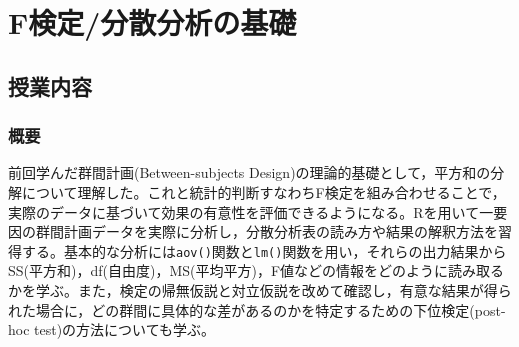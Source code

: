 \section{F検定/分散分析の基礎}
\label{b19_Ftest}

\subsection{授業内容}
\subsubsection{概要}
前回学んだ群間計画(Between-subjects Design)の理論的基礎として，平方和の分解について理解した。これと統計的判断すなわちF検定を組み合わせることで，実際のデータに基づいて効果の有意性を評価できるようになる。Rを用いて一要因の群間計画データを実際に分析し，分散分析表の読み方や結果の解釈方法を習得する。基本的な分析には\verb|aov()|関数と\verb|lm()|関数を用い，それらの出力結果からSS(平方和)，df(自由度)，MS(平均平方)，F値などの情報をどのように読み取るかを学ぶ。また，検定の帰無仮説と対立仮説を改めて確認し，有意な結果が得られた場合に，どの群間に具体的な差があるのかを特定するための下位検定(post-hoc test)の方法についても学ぶ。

